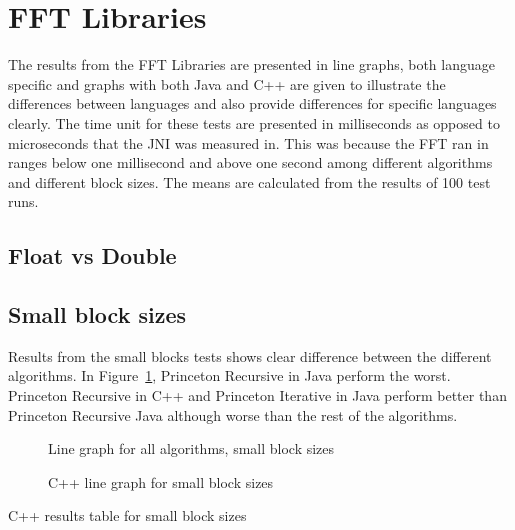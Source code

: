 \section{FFT Libraries}

The results from the FFT Libraries are presented in line graphs, both language specific and graphs with both Java and C++ are given to illustrate the differences between languages and also provide differences for specific languages clearly. The time unit for these tests are presented in milliseconds as opposed to microseconds that the JNI was measured in. This was because the FFT ran in ranges below one millisecond and above one second among different algorithms and different block sizes. The means are calculated from the results of 100 test runs.

\subsection{Float vs Double}

\subsection{Small block sizes}
Results from the small blocks tests shows clear difference between the different algorithms. In Figure~\ref{fig:all:line:small}, Princeton Recursive in Java perform the worst. Princeton Recursive in C++ and Princeton Iterative in Java perform better than Princeton Recursive Java although worse than the rest of the algorithms. %




\begin{figure}
    \centering
    
    \caption{Line graph for all algorithms, small block sizes}
    \label{fig:all:line:small}
\end{figure}

\begin{figure}
    \centering
    
    \caption{C++ line graph for small block sizes}
    \label{fig:cpp:line:small}
\end{figure}
\begin{table}
    \centering
    \caption{C++ results table for small block sizes}
    \label{tab:cpp:small}
    \resizebox{\columnwidth}{!}{
        
    }
\end{table}


